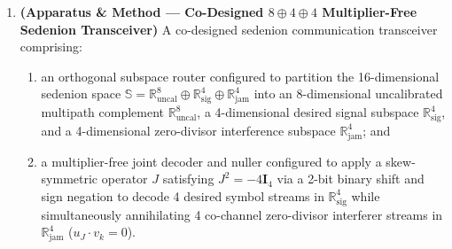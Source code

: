 \documentclass[12pt,letterpaper]{article}
\begin{document}
\begin{enumerate}[leftmargin=20pt,itemsep=4pt]
    \item \textbf{(Apparatus \& Method --- Co-Designed $8\oplus 4\oplus 4$ Multiplier-Free Sedenion Transceiver)} A co-designed sedenion communication transceiver comprising:
    \begin{enumerate}[leftmargin=16pt,itemsep=1pt]
        \item an orthogonal subspace router configured to partition the 16-dimensional sedenion space $\mathbb{S} = \mathbb{R}^8_{\mathrm{uncal}} \oplus \mathbb{R}^4_{\mathrm{sig}} \oplus \mathbb{R}^4_{\mathrm{jam}}$ into an 8-dimensional uncalibrated multipath complement $\mathbb{R}^8_{\mathrm{uncal}}$, a 4-dimensional desired signal subspace $\mathbb{R}^4_{\mathrm{sig}}$, and a 4-dimensional zero-divisor interference subspace $\mathbb{R}^4_{\mathrm{jam}}$; and
        \item a multiplier-free joint decoder and nuller configured to apply a skew-symmetric operator $J$ satisfying $J^2 = -4\mathbf{I}_4$ via a 2-bit binary shift and sign negation to decode 4 desired symbol streams in $\mathbb{R}^4_{\mathrm{sig}}$ while simultaneously annihilating 4 co-channel zero-divisor interferer streams in $\mathbb{R}^4_{\mathrm{jam}}$ ($u_J \cdot v_k = 0$).
    \end{enumerate}


\end{enumerate}
\end{document}
